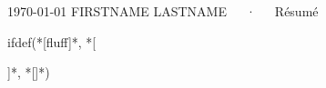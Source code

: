 \documentclass[11pt, letterpaper]{awesome-cv}
\begin{document}
\makecvheader[C]

\makecvfooter
  {\today}
  {FIRSTNAME LASTNAME~~~·~~~Résumé}
  {\thepage}






ifdef(*[fluff]*, *[
\newpage


]*, *[]*)
%
%
%
%
%
%
\end{document}
